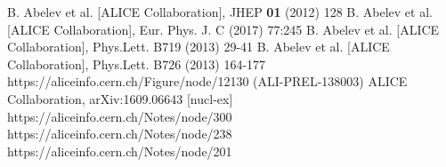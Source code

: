 \begin{thebibliography}{99}
 B. Abelev et al. [ALICE Collaboration], JHEP {\bf 01} (2012) 128
 B. Abelev et al. [ALICE Collaboration], Eur. Phys. J. C (2017) 77:245
 B. Abelev et al. [ALICE Collaboration], Phys.Lett. B719 (2013) 29-41
 B. Abelev et al. [ALICE Collaboration], Phys.Lett. B726 (2013) 164-177
 https://aliceinfo.cern.ch/Figure/node/12130 (ALI-PREL-138003)
 ALICE Collaboration, arXiv:1609.06643 [nucl-ex]
 https://aliceinfo.cern.ch/Notes/node/300
 https://aliceinfo.cern.ch/Notes/node/238
 https://aliceinfo.cern.ch/Notes/node/201
\end{thebibliography} 
